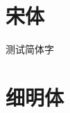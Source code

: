 \documentclass[12pt,a4paper]{article}
\begin{document}
    \tableofcontents
    \newpage
    \section{宋体}
        测试简体字
    \section{细明体}
\end{document}
